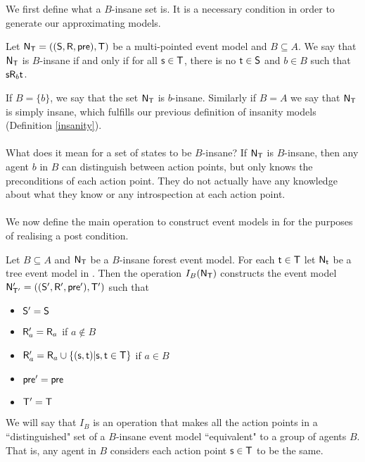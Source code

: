 We first define what a $B$-insane set is.
It is a necessary condition in order to generate our approximating \AXKFF models.

\begin{defn} \label{binsane}
	Let $\mathrm{\mathsf{N}}_\mathrm{\mathsf{T}} = ((\mathrm{\mathsf{S}}, \mathrm{\mathsf{R}}, \mathrm{\mathsf{pre}}), \mathrm{\mathsf{T}})$ be a multi-pointed event model and $B \subseteq A$.
	We say that $\mathrm{\mathsf{N}}_\mathrm{\mathsf{T}}$ is $B$-insane if and only if for all $\mathrm{\mathsf{s}} \in \mathrm{\mathsf{T}}$,
  there is no $\mathrm{\mathsf{t}} \in \mathrm{\mathsf{S}}$ and $b \in B$ such that $\mathrm{\mathsf{s}} \mathrm{\mathsf{R}}_b \mathrm{\mathsf{t}}$.
\end{defn}

If $B = \{b\}$, we say that the set $\mathrm{\mathsf{N}}_\mathrm{\mathsf{T}}$ is $b$-insane.
Similarly if $B = A$ we say that $\mathrm{\mathsf{N}}_\mathrm{\mathsf{T}}$ is simply insane, which fulfills
our previous definition of insanity models (Definition \ref{insanity}).\\
\\
What does it mean for a set of states to be $B$-insane?
If $\mathrm{\mathsf{N}}_\mathrm{\mathsf{T}}$ is $B$-insane, then any agent $b$ in $B$ can distinguish between
action points, but only knows the preconditions of each action point.
They do not actually have any knowledge about what they know or any
introspection at each action point.\\
\\
We now define the main operation to construct event models in \AXKFF for the
purposes of realising a post condition.

\begin{defn} \label{makeEquivalence}
	Let $B \subseteq A$ and $\mathrm{\mathsf{N}}_\mathrm{\mathsf{T}}$ be a $B$-insane forest event model.
  For each $\mathrm{\mathsf{t}} \in \mathrm{\mathsf{T}}$ let $\mathrm{\mathsf{N}}_\mathrm{\mathsf{t}}$ be a tree event model in \AXKFF.
  Then the operation $I_B(\mathrm{\mathsf{N}}_\mathrm{\mathsf{T}})$ constructs the event model $\mathrm{\mathsf{N}}'_{\mathrm{\mathsf{T}}'} =
  ((\mathrm{\mathsf{S}}',\mathrm{\mathsf{R}}',\mathrm{\mathsf{pre}}'),\mathrm{\mathsf{T}}')$ such that
  \begin{itemize}
    \item $\mathrm{\mathsf{S}}' = \mathrm{\mathsf{S}}$
    \item $\mathrm{\mathsf{R}}'_a = \mathrm{\mathsf{R}}_a$ if $a \notin B$
    \item $\mathrm{\mathsf{R}}'_a = \mathrm{\mathsf{R}}_a \cup \{(\mathrm{\mathsf{s}}, \mathrm{\mathsf{t}}) | \mathrm{\mathsf{s}}, \mathrm{\mathsf{t}} \in \mathrm{\mathsf{T}}\}$ if $a
    \in B$
    \item $\mathrm{\mathsf{pre}}' = \mathrm{\mathsf{pre}}$
    \item $\mathrm{\mathsf{T}}' = \mathrm{\mathsf{T}}$
  \end{itemize}
\end{defn}

We will say that $I_B$ is an operation that makes all the action
points in a ``distinguished" set of a $B$-insane event model ``equivalent" to a
group of agents $B$.
That is, any agent in $B$ considers each action point $\mathrm{\mathsf{s}} \in \mathrm{\mathsf{T}}$ to be the
same.

